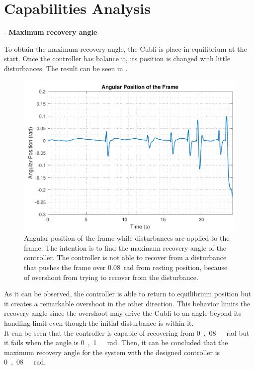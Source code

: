 \section{Capabilities Analysis}
- \textbf{Maximum recovery angle}

To obtain the maximum recovery angle, the Cubli is place in equilibrium at the start. Once the controller has balance it, its position is changed with little disturbances. The result can be seen in .
%
\begin{figure}[H]
	\centering
	\includegraphics[scale=0.62]{figures/testRecovery}
	\caption{Angular position of the frame while disturbances are applied to the frame. The intention is to find the maximum recovery angle of the controller. The controller is not able to recover from a disturbance that pushes the frame over \SI{0,08}{rad} from resting position, because of overshoot from trying to recover from the disturbance.}
	\label{testRecovery}
\end{figure}\vspace{-5mm}
%
As it can be observed, the controller is able to return to equilibrium position but it creates a remarkable overshoot in the other direction. This behavior limits the recovery angle since the overshoot may drive the Cubli to an angle beyond its handling limit even though the initial disturbance is within it.\\
It can be seen that the controller is capable of recovering from \si{0,08\ rad} but it fails when the angle is \si{0,1\ rad}. Then, it can be concluded that the maximum recovery angle for the system with the designed controller is \si{0,08\ rad}.

